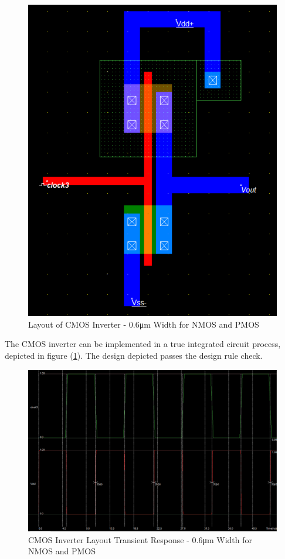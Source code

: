 \begin{figure}[h!]
	\centering
	\includegraphics[scale=0.75]{./images/inverter_06nmos06pmos.PNG}
	\caption{Layout of CMOS Inverter - 0.6\si{\micro\meter} Width for NMOS and PMOS}
	\label{fig:inverter_layout}
\end{figure}

\FloatBarrier

The CMOS inverter can be implemented in a true integrated circuit process, depicted in figure (\ref{fig:inverter_layout}).
The design depicted passes the design rule check.

\FloatBarrier

\begin{figure}[h!]
	\centering
	\includegraphics[scale=0.50]{./images/inverter_transient_06nmos_06pmos.PNG}
	\caption{CMOS Inverter Layout Transient Response - 0.6\si{\micro\meter} Width for NMOS and PMOS}
	\label{fig:cmos_layout_transient}
\end{figure}

